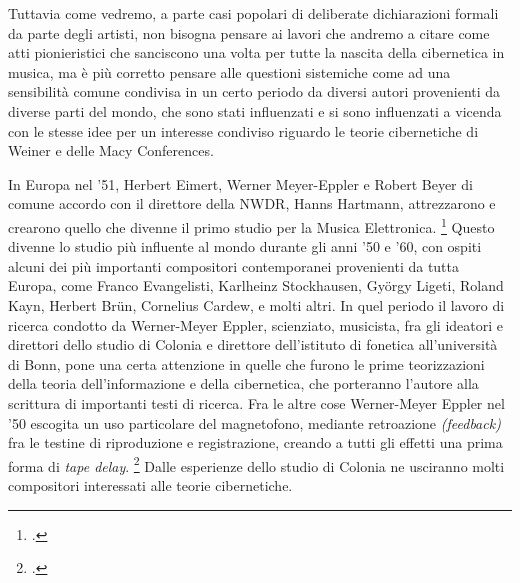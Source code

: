 Tuttavia come vedremo, a parte casi popolari di deliberate dichiarazioni
formali da parte degli artisti, non bisogna pensare ai lavori che andremo a citare
come atti pionieristici che sanciscono una volta per tutte la nascita della cibernetica in musica,
ma è più corretto pensare alle questioni sistemiche come ad una sensibilità
comune condivisa in un certo periodo da diversi autori provenienti da diverse parti del mondo,
che sono stati influenzati e si sono influenzati a vicenda
con le stesse idee per un interesse condiviso riguardo
le teorie cibernetiche di Weiner e delle Macy Conferences. 

In Europa nel '51, Herbert Eimert, Werner Meyer-Eppler e Robert Beyer
di comune accordo con il direttore della NWDR, Hanns Hartmann,
attrezzarono e crearono quello che divenne il primo studio per la Musica Elettronica. 
\footcite{discipiocircuitideltempo}
Questo divenne lo studio più influente al mondo durante gli anni '50 e '60,
con ospiti alcuni dei più importanti compositori contemporanei provenienti da tutta Europa,
come Franco Evangelisti, Karlheinz Stockhausen, György Ligeti, Roland Kayn, Herbert Brün,
Cornelius Cardew, e molti altri.
In quel periodo il lavoro di ricerca condotto da Werner-Meyer Eppler,
scienziato, musicista, fra gli ideatori e direttori dello studio di Colonia e
direttore dell'istituto di fonetica all'università di Bonn,
pone una certa attenzione in quelle che furono le prime
teorizzazioni della teoria dell'informazione e della cibernetica,
che porteranno l'autore alla scrittura di importanti testi di ricerca.
Fra le altre cose Werner-Meyer Eppler nel '50 escogita un uso particolare
del magnetofono, mediante retroazione \textit{(feedback)} fra le testine di riproduzione e 
registrazione, creando a tutti gli effetti una prima forma di \textit{tape delay}. \footcite{discipiocircuitideltempo}
Dalle esperienze dello studio di Colonia ne usciranno molti compositori interessati
alle teorie cibernetiche. 

